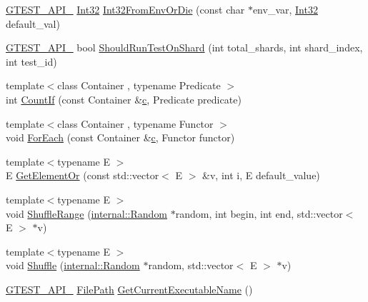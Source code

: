 \begin{DoxyCompactItemize}
\item 
\hyperlink{gtest-port_8h_aa73be6f0ba4a7456180a94904ce17790}{G\+T\+E\+S\+T\+\_\+\+A\+P\+I\+\_\+} \hyperlink{namespacetesting_1_1internal_a8ee38faaf875f133358abaf9bc056cec}{Int32} \hyperlink{namespacetesting_1_1internal_aaa576613655c2f380278c255c3ec5fef}{Int32\+From\+Env\+Or\+Die} (const char $\ast$env\+\_\+var, \hyperlink{namespacetesting_1_1internal_a8ee38faaf875f133358abaf9bc056cec}{Int32} default\+\_\+val)
\item 
\hyperlink{gtest-port_8h_aa73be6f0ba4a7456180a94904ce17790}{G\+T\+E\+S\+T\+\_\+\+A\+P\+I\+\_\+} bool \hyperlink{namespacetesting_1_1internal_a437bd89f5bc532778d7467600e210395}{Should\+Run\+Test\+On\+Shard} (int total\+\_\+shards, int shard\+\_\+index, int test\+\_\+id)
\item 
{\footnotesize template$<$class Container , typename Predicate $>$ }\\int \hyperlink{namespacetesting_1_1internal_a1e77a774d910346eff11a86d8df783a5}{Count\+If} (const Container \&\hyperlink{jquery_8js_abce695e0af988ece0826d9ad59b8160d}{c}, Predicate predicate)
\item 
{\footnotesize template$<$class Container , typename Functor $>$ }\\void \hyperlink{namespacetesting_1_1internal_a52f5504ed65d116201ccb8f99a44fd7e}{For\+Each} (const Container \&\hyperlink{jquery_8js_abce695e0af988ece0826d9ad59b8160d}{c}, Functor functor)
\item 
{\footnotesize template$<$typename E $>$ }\\E \hyperlink{namespacetesting_1_1internal_a71fdd20a0686bea3dc0cdcd95e0bca1c}{Get\+Element\+Or} (const std\+::vector$<$ E $>$ \&v, int i, E default\+\_\+value)
\item 
{\footnotesize template$<$typename E $>$ }\\void \hyperlink{namespacetesting_1_1internal_a0e1d3dc36138a591769412d4c7779861}{Shuffle\+Range} (\hyperlink{classtesting_1_1internal_1_1_random}{internal\+::\+Random} $\ast$random, int begin, int end, std\+::vector$<$ E $>$ $\ast$v)
\item 
{\footnotesize template$<$typename E $>$ }\\void \hyperlink{namespacetesting_1_1internal_a90d9e6ffe8522a7eb1b2ce9b1a0c4673}{Shuffle} (\hyperlink{classtesting_1_1internal_1_1_random}{internal\+::\+Random} $\ast$random, std\+::vector$<$ E $>$ $\ast$v)
\item 
\hyperlink{gtest-port_8h_aa73be6f0ba4a7456180a94904ce17790}{G\+T\+E\+S\+T\+\_\+\+A\+P\+I\+\_\+} \hyperlink{classtesting_1_1internal_1_1_file_path}{File\+Path} \hyperlink{namespacetesting_1_1internal_a7a2bbf069f75bc99873976ad6fc356ad}{Get\+Current\+Executable\+Name} ()

\end{DoxyCompactItemize}
